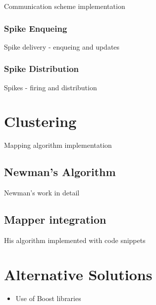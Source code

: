 Communication scheme implementation

\subsubsection{Spike Enqueing}

Spike delivery - enqueing and updates

\subsubsection{Spike Distribution}

Spikes - firing and distribution

\section{Clustering}

Mapping algorithm implementation

\subsection{Newman's Algorithm}

Newman's work in detail

\subsection{Mapper integration}

His algorithm implemented with code snippets

\section{Alternative Solutions}

\begin{itemize}
\item{Use of Boost libraries}
\end{itemize}
